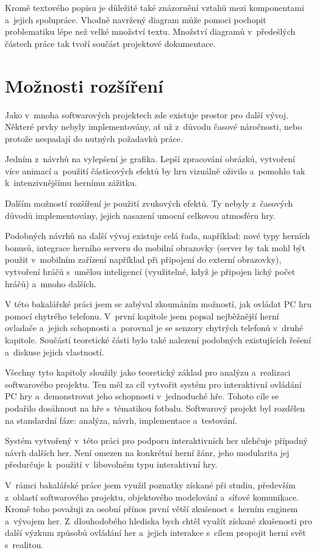 \documentclass[thesis=B,czech,hidelinks]{FITthesis}[2012/06/26] %
\begin{document}
Kromě textového popisu je důležité také znázornění vztahů mezi komponentami a~jejich spolupráce. Vhodně navržený diagram může pomoci pochopit problematiku lépe než velké množství textu. Množství diagramů v~předešlých částech práce tak tvoří součást projektové dokumentace.

\section{Možnosti rozšíření}

Jako v~mnoha softwarových projektech zde existuje prostor pro další vývoj. Některé prvky nebyly implementovány, ať už z~důvodu časové náročnosti, nebo protože nespadají do nutných požadavků práce.

Jedním z~návrhů na vylepšení je grafika. Lepší zpracování obrázků, vytvoření více animací a~použití částicových efektů by hru vizuálně oživilo a~pomohlo tak k~intenzivnějšímu hernímu zážitku.

Dalším možností rozšíření je použití zvukových efektů. Ty nebyly z~časových důvodů implementovány, jejich nasazení umocní celkovou atmosféru hry.

Podobných návrhů na další vývoj existuje celá řada, například: nové typy herních bonusů, integrace herního serveru do mobilní obrazovky (server by tak mohl být použit v~mobilním zařízení například při připojení do externí obrazovky), vytvoření hráčů s~umělou inteligencí (využitelné, když je připojen lichý počet hráčů) a~mnoho dalších.

\begin{conclusion}
	
V této bakalářské práci jsem se zabýval zkoumáním možností, jak ovládat PC hru pomocí chytrého telefonu. V~první kapitole jsem popsal nejběžnější herní ovladače a~jejich schopnosti a~porovnal je se senzory chytrých telefonů v~druhé kapitole. Součástí teoretické části bylo také nalezení podobných existujících řešení a~diskuse jejich vlastností.

Všechny tyto kapitoly sloužily jako teoretický základ pro analýzu a~realizaci softwarového projektu. Ten měl za cíl vytvořit systém pro interaktivní ovládání PC hry a~demonstrovat jeho schopnosti v~jednoduché hře. Tohoto cíle se podařilo dosáhnout na hře s~tématikou fotbalu. Softwarový projekt byl rozdělen na standardní fáze: analýza, návrh, implementace a~testování.

Systém vytvořený v~této práci pro podporu interaktivních her ulehčuje případný návrh dalších her. Není omezen na konkrétní herní žánr, jeho modularita jej předurčuje k~použití v~libovolném typu interaktivní hry. 

V~rámci bakalářské práce jsem využil poznatky získané při studiu, především z~oblastí softwarového projektu, objektového modelování a~síťové komunikace. Kromě toho považuji za osobní přínos první větší zkušenost s~herním enginem a~vývojem her. Z~dlouhodobého hlediska bych chtěl využít získané zkušenosti pro další výzkum způsobů ovládání her a~jejich interakce s~cílem propojit herní svět s~realitou. 
	
\end{conclusion}
\end{document}

